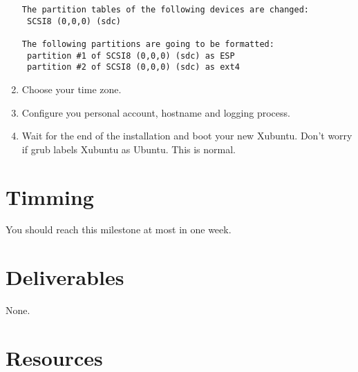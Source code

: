 \begin{enumerate}
\begin{verbatim}
The partition tables of the following devices are changed:
 SCSI8 (0,0,0) (sdc)

The following partitions are going to be formatted:
 partition #1 of SCSI8 (0,0,0) (sdc) as ESP
 partition #2 of SCSI8 (0,0,0) (sdc) as ext4
\end{verbatim}

\item Choose your time zone.
  
\item Configure you personal account, hostname and logging process.
  
\item Wait for the end of the installation and boot your new
  Xubuntu. Don't worry if grub labels Xubuntu as Ubuntu. This is
  normal.
  
\end{enumerate}

\section{Timming}

You should reach this milestone at most in one week.

\section{Deliverables}

None.

\section{Resources}


